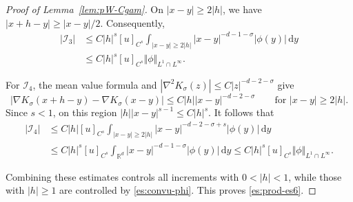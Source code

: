 \documentclass[reqno,11pt,a4paper]{amsart}
\newcommand{\R}{\ensuremath{\mathbb{R}}}
\newcommand{\dd}{\mathrm{d}}
\begin{document}
\begin{proof}[Proof of Lemma~\ref{lem:pW-Cgam}]
On $|x-y|\geq2|h|$, we have
$|x+h-y|\geq|x-y|/2$.
Consequently,
\begin{align*}
  |\mathcal I_3|
  &\leq
  C|h|^s[u]_{C^s}
  \int_{|x-y|\geq2|h|}
  |x-y|^{-d-1-\sigma}|\phi(y)|\,\dd y
  \\
  &\leq
  C|h|^s[u]_{C^s}
  \Vert \phi\Vert _{L^1\cap L^\infty}.
\end{align*}

For $\mathcal I_4$, the mean value formula and
$|\nabla^2K_\sigma(z)|\leq C|z|^{-d-2-\sigma}$
give
\[
  |\nabla K_\sigma(x+h-y)-\nabla K_\sigma(x-y)|
  \leq C|h||x-y|^{-d-2-\sigma}
  \qquad\text{for }|x-y|\geq2|h|.
\]
Since $s<1$, on this region
$|h||x-y|^{s-1}\leq C|h|^s$. 
It follows that
\begin{align*}
  |\mathcal I_4|
  &\leq
  C|h|[u]_{C^s}
  \int_{|x-y|\geq2|h|}
  |x-y|^{-d-2-\sigma+s}|\phi(y)|\,\dd y
  \\
  &\leq
  C|h|^s[u]_{C^s}
  \int_{\R^d}
  |x-y|^{-d-1-\sigma}|\phi(y)|\,\dd y
  \leq
  C|h|^s[u]_{C^s}
  \Vert \phi\Vert _{L^1\cap L^\infty}.
\end{align*}

Combining these estimates controls all increments
with $0<|h|<1$, while those with $|h|\geq1$
are controlled by \eqref{es:convu-phi}.
This proves \eqref{es:prod-es6}.

\end{proof}
\end{document}
